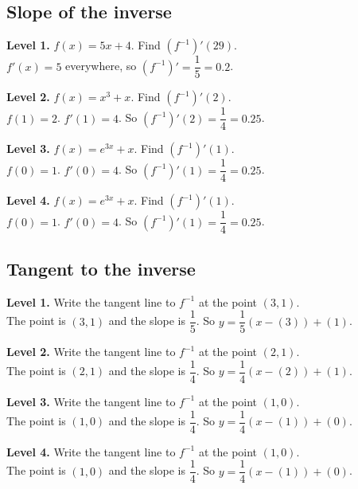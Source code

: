 \documentclass[11pt]{article}
\begin{document}
\subsection*{Slope of the inverse}
\noindent\textbf{Level 1.} $f(x)=5x+4$. Find $(f^{-1})'(29)$.\\  \quad $f'(x)=5$ everywhere, so $(f^{-1})'=\dfrac1{5}=0.2$.\par\medskip
\noindent\textbf{Level 2.} $f(x)=x^{3}+x$. Find $(f^{-1})'(2)$.\\  \quad $f(1)=2$. $f'(1)=4$. So $(f^{-1})'(2)=\dfrac1{4}=0.25$.\par\medskip
\noindent\textbf{Level 3.} $f(x)=e^{3x}+x$. Find $(f^{-1})'(1)$.\\  \quad $f(0)=1$. $f'(0)=4$. So $(f^{-1})'(1)=\dfrac1{4}=0.25$.\par\medskip
\noindent\textbf{Level 4.} $f(x)=e^{3x}+x$. Find $(f^{-1})'(1)$.\\  \quad $f(0)=1$. $f'(0)=4$. So $(f^{-1})'(1)=\dfrac1{4}=0.25$.\par\medskip
\subsection*{Tangent to the inverse}
\noindent\textbf{Level 1.} Write the tangent line to $f^{-1}$ at the point $(3,1)$.\\  \quad The point is $(3,1)$ and the slope is $\dfrac1{5}$. So $y=\dfrac1{5}(x-(3))+(1)$.\par\medskip
\noindent\textbf{Level 2.} Write the tangent line to $f^{-1}$ at the point $(2,1)$.\\  \quad The point is $(2,1)$ and the slope is $\dfrac1{4}$. So $y=\dfrac1{4}(x-(2))+(1)$.\par\medskip
\noindent\textbf{Level 3.} Write the tangent line to $f^{-1}$ at the point $(1,0)$.\\  \quad The point is $(1,0)$ and the slope is $\dfrac1{4}$. So $y=\dfrac1{4}(x-(1))+(0)$.\par\medskip
\noindent\textbf{Level 4.} Write the tangent line to $f^{-1}$ at the point $(1,0)$.\\  \quad The point is $(1,0)$ and the slope is $\dfrac1{4}$. So $y=\dfrac1{4}(x-(1))+(0)$.\par\medskip
\end{document}
